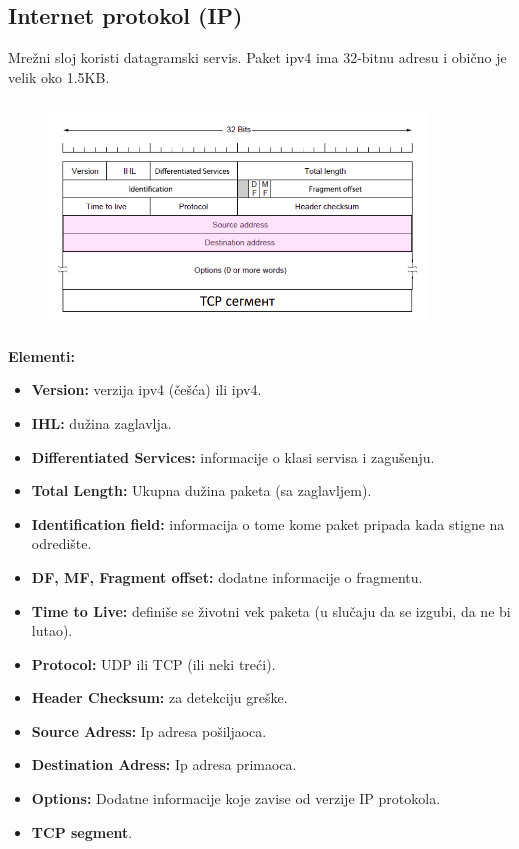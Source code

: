\documentclass[a4paper]{article}
\begin{document}
    \subsection{Internet protokol (IP)}
    Mrežni sloj koristi datagramski servis. Paket ipv4 ima 32-bitnu adresu i 
    obično je velik oko 1.5KB.
    \begin{figure}[H]
        \begin{center}
            \includegraphics[width=100mm,height=60mm]{Slike/ip_protokol.png}
        \end{center}
    \end{figure}
    \textbf{Elementi:}
    \begin{itemize}
        \item \textbf{Version:} verzija ipv4 (češća) ili ipv4.
        \item \textbf{IHL:} dužina zaglavlja.
        \item \textbf{Differentiated Services:} informacije o klasi servisa i zagušenju.
        \item \textbf{Total Length:} Ukupna dužina paketa (sa zaglavljem).
        \item \textbf{Identification field:} informacija o tome kome paket pripada
              kada stigne na odredište.
        \item \textbf{DF, MF, Fragment offset:} dodatne informacije o fragmentu.
        \item \textbf{Time to Live:} definiše se životni vek paketa (u slučaju da se izgubi,
              da ne bi lutao).
        \item \textbf{Protocol:} UDP ili TCP (ili neki treći).
        \item \textbf{Header Checksum:} za detekciju greške.
        \item \textbf{Source Adress:} Ip adresa pošiljaoca.
        \item \textbf{Destination Adress:} Ip adresa primaoca.
        \item \textbf{Options:} Dodatne informacije koje zavise od verzije IP protokola.
        \item \textbf{TCP segment}.
    \end{itemize}
\end{document}
